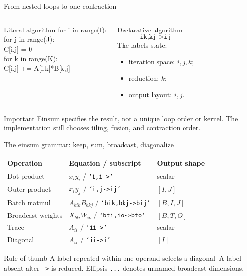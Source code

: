 \documentclass[aspectratio=169,10pt]{beamer}
\newcommand{\einsum}[1]{\texttt{#1}}
\begin{document}
\begin{frame}{From nested loops to one contraction}
\begin{columns}[T]
\begin{block}{Literal algorithm}
\ttfamily\small
for i in range(I):\\
\quad for j in range(J):\\
\qquad C[i,j] = 0\\
\qquad for k in range(K):\\
\qquad\quad C[i,j] += A[i,k]*B[k,j]
\end{block}
\begin{block}{Declarative algorithm}
\[
\einsum{ik,kj->ij}
\]
The labels state:
\begin{itemize}
 \item iteration space: $i,j,k$;
 \item reduction: $k$;
 \item output layout: $i,j$.
\end{itemize}
\end{block}
\end{columns}
\begin{alertblock}{Important}
Einsum specifies the result, not a unique loop order or kernel. The implementation still chooses tiling, fusion, and contraction order.
\end{alertblock}
\end{frame}

\begin{frame}{The einsum grammar: keep, sum, broadcast, diagonalize}
\small
\begin{tabular}{lll}
\toprule
Operation & Equation / subscript & Output shape \\
\midrule
Dot product & $x_i y_i$ / \einsum{`i,i->'} & scalar \\
Outer product & $x_i y_j$ / \einsum{`i,j->ij'} & $[I,J]$ \\
Batch matmul & $A_{bik}B_{bkj}$ / \einsum{`bik,bkj->bij'} & $[B,I,J]$ \\
Broadcast weights & $X_{bti}W_{io}$ / \einsum{`bti,io->bto'} & $[B,T,O]$ \\
Trace & $A_{ii}$ / \einsum{`ii->'} & scalar \\
Diagonal & $A_{ii}$ / \einsum{`ii->i'} & $[I]$ \\
\bottomrule
\end{tabular}
\vspace{0.8em}
\begin{block}{Rule of thumb}
A label repeated within one operand selects a diagonal. A label absent after \texttt{->} is reduced. Ellipsis \texttt{...} denotes unnamed broadcast dimensions.
\end{block}
\end{frame}
\end{document}
